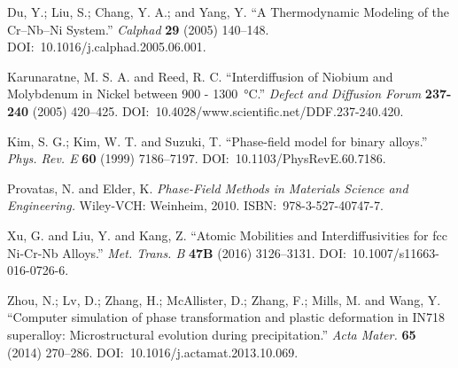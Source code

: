 \documentclass[10pt]{article}
\begin{document}
	\begin{thebibliography}{1}
		 Du, Y.; Liu, S.; Chang, Y. A.; and Yang, Y.
		                 ``A Thermodynamic Modeling of the Cr--Nb--Ni System.''
		                 \emph{Calphad} \textbf{29} (2005) 140--148.
		                 DOI:~10.1016/j.calphad.2005.06.001.

		 Karunaratne, M. S. A. and Reed, R. C.
		                          ``Interdiffusion of Niobium and Molybdenum in Nickel between 900 - \SI{1300}{\degreeCelsius}.''
		                          \emph{Defect and Diffusion Forum} \textbf{237-240} (2005) 420--425.
		                          DOI:~10.4028/www.scientific.net/DDF.237-240.420.

		 Kim, S. G.; Kim, W. T. and Suzuki, T.
		                  ``Phase-field model for binary alloys.''
		                  \emph{Phys. Rev. E} \textbf{60} (1999) 7186--7197.
		                  DOI:~10.1103/PhysRevE.60.7186.

		 Provatas, N. and Elder, K.
		                       \emph{Phase-Field Methods in Materials Science and Engineering.}
		                       Wiley-VCH: Weinheim, 2010.
		                       ISBN:~978-3-527-40747-7.

		 Xu, G. and Liu, Y. and Kang, Z.
		                          ``Atomic Mobilities and Interdiffusivities for fcc Ni-Cr-Nb Alloys.''
		                          \emph{Met. Trans. B} \textbf{47B} (2016) 3126--3131.
		                          DOI:~10.1007/s11663-016-0726-6.

		 Zhou, N.; Lv, D.; Zhang, H.; McAllister, D.; Zhang, F.; Mills, M. and Wang, Y.
		                   ``Computer simulation of phase transformation and plastic deformation in IN718 superalloy: Microstructural evolution during precipitation.''
		                   \emph{Acta Mater.} \textbf{65} (2014) 270--286.
		                   DOI:~10.1016/j.actamat.2013.10.069.
	\end{thebibliography}
\end{document}

